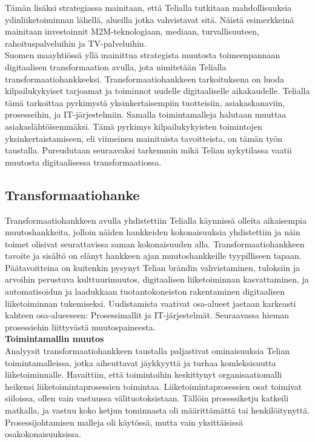 \documentclass[finnish,12pt,a4paper,pdftex]{article}
\begin{document}
Tämän lisäksi strategiassa mainitaan, että Telialla tutkitaan mahdollisuuksia ydinliiketoiminnan lähellä, alueilla jotka vahvistavat sitä. Näistä esimerkkeinä mainitaan investoinnit M2M-teknologiaan, mediaan, turvallisuuteen, rahoituspalveluihin ja TV-palveluihin.\\

 Suomen maayhtiössä yllä mainittua strategista muutosta toimeenpannaan digitaalisen transformaation avulla, jota nimitetään Telialla transformaatiohankkeeksi. Transformaatiohankkeen tarkoituksena on luoda kilpailukykyiset tarjoamat ja toiminnot uudelle digitaaliselle aikakaudelle. Telialla tämä tarkoittaa pyrkimystä yksinkertaisempiin tuotteisiin, asiakaskanaviin, prosesseihin, ja IT-järjestelmiin. Samalla toimintamalleja halutaan muuttaa asiakaslähtöisemmäksi. Tämä pyrkimys kilpailukykyisten toimintojen yksinkertaistamiseen, eli viimeinen mainituista tavoitteista, on tämän työn taustalla. Pureudutaan seuraavaksi tarkemmin mikä Telian nykytilassa vaatii muutosta digitaalisessa transformaatiossa.

\subsection{Transformaatiohanke}

Transformaatiohankkeen avulla yhdistettiin Telialla käynnissä olleita aikaisempia muutoshankkeita, jolloin näiden hankkeiden kokonaisuuksia yhdistettiin ja näin toimet olisivat seurattavissa saman kokonaisuuden alla. Transformaatiohankkeen tavoite ja sisältö on elänyt hankkeen ajan muutoshankkeille tyypilliseen tapaan. Päätavoitteina on kuitenkin pysynyt Telian brändin vahvistaminen, tuloksiin ja arvoihin perustuva kulttuurimuutos, digitaalisen liiketoiminnan kasvattaminen, ja automatisoidun ja laadukkaan tuotantokoneiston rakentaminen digitaalisen liiketoiminnan tukemiseksi. Uudistamista vaativat osa-alueet jaetaan karkeasti kahteen osa-alueeseen: Prosessimallit ja IT-järjestelmät. Seuraavassa hieman prosessiehin liittyvästä muutospaineesta.\\

\textbf{Toimintamallin muutos}\\

Analyysit transformaatiohankkeen taustalla paljastivat ominaisuuksia Telian toimintamalleissa, jotka aiheuttavat jäykkyyttä ja turhaa komleksisuutta liiketoiminnalle. Havaittiin, että toimintoihin keskittynyt organisaatiomalli heikensi liiketoimintaprosessien toimintaa. Liiketoimintaprosessien osat toimivat siiloissa, ollen vain vastuussa välituotoksistaan. Tällöin prosessiketju katkeili matkalla, ja vastuu koko ketjun tominnasta oli määrittämättä tai henkilöitynyttä. Prosessijohtamisen malleja oli käytössä, mutta vain yksittäisissä osakokonaisuuksissa.\\
\end{document}
